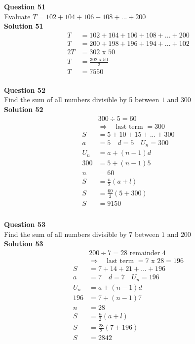 \documentclass{article}
\begin{document}
\noindent\textbf{Question 51}\\[5pt]
Evaluate $T=102+104+106+108+...+200$\\[5pt]
\noindent\textbf{Solution 51}\\[5pt]
\begin{align*}
T&=102+104+106+108+...+200\\[2pt]
T&=200+198+196+194+...+102\\[2pt]
2T&=302\,\,\text{x}\,\,50\\[2pt]
T&=\displaystyle\frac{302\,\,\text{x}\,\,50}{2}\\[2pt]
T&=7550
\end{align*}\\[10pt]

\noindent\textbf{Question 52}\\[5pt]
Find the sum of all numbers divisible by 5 between $1$ and $300$\\[5pt]
\noindent\textbf{Solution 52}\\[5pt]
\begin{align*}
&300 \div 5 = 60\\[2pt]
&\Rightarrow \quad \text{last term }= 300\\[2pt]
S&=5+10+15+...+300\\[12pt]
a&=5\quad d=5 \quad U_n=300\\[2pt]
U_n&=a+(n-1)d\\[2pt]
300&=5+(n-1)5\\[2pt]
n&=60\\[12pt]
S&=\displaystyle\frac{n}{2}(a+l)\\[2pt]
S&=\displaystyle\frac{60}{2}(5+300)\\[2pt]
S&=9150\\[-50pt]
\end{align*}\\[10pt]

\noindent\textbf{Question 53}\\[5pt]
Find the sum of all numbers divisible by 7 between $1$ and $200$\\[5pt]
\noindent\textbf{Solution 53}\\[5pt]
\begin{align*}
&200 \div 7 = 28 \,\, \text{remainder}\,\, 4\\[2pt]
&\Rightarrow \quad \text{last term }= 7 \,\,\text{x}\,\, 28=196\\[2pt]
S&=7+14+21+...+196\\[12pt]
a&=7\quad d=7 \quad U_n=196\\[2pt]
U_n&=a+(n-1)d\\[2pt]
196&=7+(n-1)7\\[2pt]
n&=28\\[12pt]
S&=\displaystyle\frac{n}{2}(a+l)\\[2pt]
S&=\displaystyle\frac{28}{2}(7+196)\\[2pt]
S&=2842\\[-140pt]
\end{align*}\\[10pt]
\end{document}

